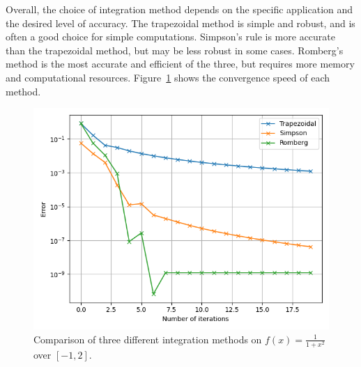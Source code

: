 \smallbreak
Overall, the choice of integration method depends on the specific application and the desired level of accuracy.
The trapezoidal method is simple and robust, and is often a good choice for simple computations.
Simpson's rule is more accurate than the trapezoidal method, but may be less robust in some cases.
Romberg's method is the most accurate and efficient of the three, but requires more memory and computational resources.
Figure~\ref{fig:convergence} shows the convergence speed of each method.

\begin{figure}[htbp]
	\centering
	\includegraphics[width=0.45\linewidth]{res/convergence.png}
	\caption{Comparison of three different integration methods on $f(x) = \frac{1}{1 + x^2}$ over $[-1, 2]$.}
	\label{fig:convergence}
\end{figure}

\vspace*{-0.5cm}
